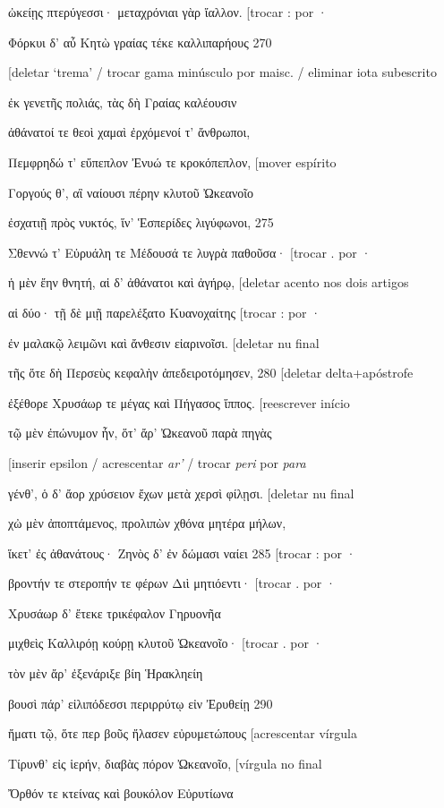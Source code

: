 ὠκείῃς πτερύγεσσι· μεταχρόνιαι γὰρ ἴαλλον. {[}trocar : por ·

Φόρκυι δ' αὖ Κητὼ γραίας τέκε καλλιπαρήους 270

{[}deletar `trema' / trocar gama minúsculo por maisc. / eliminar iota
subescrito

ἐκ γενετῆς πολιάς, τὰς δὴ Γραίας καλέουσιν

ἀθάνατοί τε θεοὶ χαμαὶ ἐρχόμενοί τ' ἄνθρωποι,

Πεμφρηδώ τ' εὔπεπλον Ἐνυώ τε κροκόπεπλον, {[}mover espírito

Γοργούς θ', αἳ ναίουσι πέρην κλυτοῦ Ὠκεανοῖο

ἐσχατιῇ πρὸς νυκτός, ἵν' Ἑσπερίδες λιγύφωνοι, 275

Σθεννώ τ' Εὐρυάλη τε Μέδουσά τε λυγρὰ παθοῦσα· {[}trocar . por ·

ἡ μὲν ἔην θνητή, αἱ δ' ἀθάνατοι καὶ ἀγήρῳ, {[}deletar acento nos dois
artigos

αἱ δύο· τῇ δὲ μιῇ παρελέξατο Κυανοχαίτης {[}trocar : por ·

ἐν μαλακῷ λειμῶνι καὶ ἄνθεσιν εἰαρινοῖσι. {[}deletar nu final

τῆς ὅτε δὴ Περσεὺς κεφαλὴν ἀπεδειροτόμησεν, 280 {[}deletar
delta+apóstrofe

ἐξέθορε Χρυσάωρ τε μέγας καὶ Πήγασος ἵππος. {[}reescrever início

τῷ μὲν ἐπώνυμον ἦν, ὅτ' ἄρ' Ὠκεανοῦ παρὰ πηγὰς

{[}inserir epsilon / acrescentar \emph{ar'} / trocar \emph{peri} por
\emph{para}

γένθ', ὁ δ' ἄορ χρύσειον ἔχων μετὰ χερσὶ φίλῃσι. {[}deletar nu final

χὠ μὲν ἀποπτάμενος, προλιπὼν χθόνα μητέρα μήλων,

ἵκετ' ἐς ἀθανάτους· Ζηνὸς δ' ἐν δώμασι ναίει 285 {[}trocar : por ·

βροντήν τε στεροπήν τε φέρων Διὶ μητιόεντι· {[}trocar . por ·

Χρυσάωρ δ' ἔτεκε τρικέφαλον Γηρυονῆα

μιχθεὶς Καλλιρόῃ κούρῃ κλυτοῦ Ὠκεανοῖο· {[}trocar . por ·

τὸν μὲν ἄρ' ἐξενάριξε βίη Ἡρακληείη

βουσὶ πάρ' εἰλιπόδεσσι περιρρύτῳ εἰν Ἐρυθείῃ 290

ἤματι τῷ, ὅτε περ βοῦς ἤλασεν εὐρυμετώπους {[}acrescentar vírgula

Τίρυνθ' εἰς ἱερήν, διαβὰς πόρον Ὠκεανοῖο, {[}vírgula no final

Ὄρθόν τε κτείνας καὶ βουκόλον Εὐρυτίωνα

